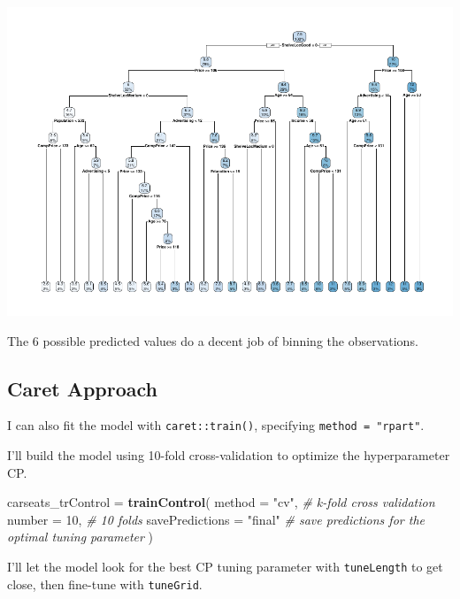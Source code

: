 \documentclass[
]{book}
\newenvironment{Shaded}{\begin{snugshade}}{\end{snugshade}}
\newcommand{\CommentTok}[1]{\textcolor[rgb]{0.56,0.35,0.01}{\textit{#1}}}
\newcommand{\DataTypeTok}[1]{\textcolor[rgb]{0.13,0.29,0.53}{#1}}
\newcommand{\DecValTok}[1]{\textcolor[rgb]{0.00,0.00,0.81}{#1}}
\newcommand{\KeywordTok}[1]{\textcolor[rgb]{0.13,0.29,0.53}{\textbf{#1}}}
\newcommand{\NormalTok}[1]{#1}
\newcommand{\StringTok}[1]{\textcolor[rgb]{0.31,0.60,0.02}{#1}}
\begin{document}
\includegraphics{data-sci_files/figure-latex/unnamed-chunk-73-1.pdf}

The 6 possible predicted values do a decent job of binning the observations.

\hypertarget{caret-approach-1}{%
\subsection{Caret Approach}\label{caret-approach-1}}

I can also fit the model with \texttt{caret::train()}, specifying \texttt{method\ =\ "rpart"}.

I'll build the model using 10-fold cross-validation to optimize the hyperparameter CP.

\begin{Shaded}
\begin{Highlighting}[]
\NormalTok{carseats_trControl =}\StringTok{ }\KeywordTok{trainControl}\NormalTok{(}
   \DataTypeTok{method =} \StringTok{"cv"}\NormalTok{,  }\CommentTok{# k-fold cross validation}
   \DataTypeTok{number =} \DecValTok{10}\NormalTok{,  }\CommentTok{# 10 folds}
   \DataTypeTok{savePredictions =} \StringTok{"final"}       \CommentTok{# save predictions for the optimal tuning parameter}
\NormalTok{)}
\end{Highlighting}
\end{Shaded}

I'll let the model look for the best CP tuning parameter with \texttt{tuneLength} to get close, then fine-tune with \texttt{tuneGrid}.
\end{document}
